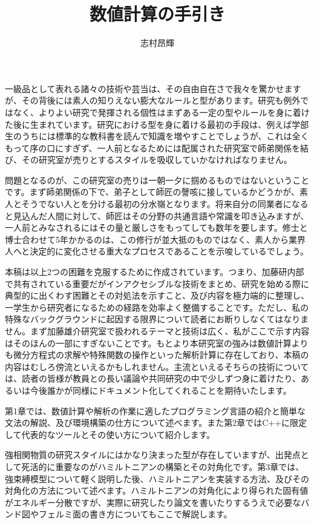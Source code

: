 \documentclass[12pt]{jreport}
\begin{document}
\title{数値計算の手引き}
\author{志村昂輝}
\maketitle

一級品として表れる諸々の技術や芸当は、その自由自在さで我々を驚かせますが、その背後には素人の知りえない膨大なルールと型があります。研究も例外ではなく、よりよい研究で発揮される個性はまずある一定の型やルールを身に着けた後に生まれています。研究における型を身に着ける最初の手段は、例えば学部生のうちには標準的な教科書を読んで知識を増やすことでしょうが、これは全くもって序の口にすぎず、一人前となるためには配属された研究室で師弟関係を結び、その研究室が売りとするスタイルを吸収していかなければなりません。

問題となるのが、この研究室の売りは一朝一夕に掴めるものではないということです。まず師弟関係の下で、弟子として師匠の謦咳に接しているかどうかが、素人とそうでない人とを分ける最初の分水嶺となります。将来自分の同業者になると見込んだ人間に対して、師匠はその分野の共通言語や常識を叩き込みますが、一人前とみなされるにはその量と厳しさをもってしても数年を要します。修士と博士合わせて5年かかるのは、この修行が並大抵のものではなく、素人から業界人へと決定的に変化させる重大なプロセスであることを示唆しているでしょう。

本稿は以上2つの困難を克服するために作成されています。つまり、加藤研内部で共有されている重要だがインアクセシブルな技術をまとめ、研究を始める際に典型的に出くわす困難とその対処法を示すこと、及び内容を極力端的に整理し、一学生から研究者になるための経路を効率よく整備することです。ただし、私の特殊なバックグラウンドに起因する限界について読者にお断りしなくてはなりません。まず加藤雄介研究室で扱われるテーマと技術は広く、私がここで示す内容はそのほんの一部にすぎないことです。もとより本研究室の強みは数値計算よりも微分方程式の求解や特殊関数の操作といった解析計算に存在しており、本稿の内容はむしろ傍流といえるかもしれません。主流といえるそちらの技術については、読者の皆様が教員との長い議論や共同研究の中で少しずつ身に着けたり、あるいは今後誰かが同様にドキュメント化してくれることを期待いたします。

第1章では、数値計算や解析の作業に適したプログラミング言語の紹介と簡単な文法の解説、及び環境構築の仕方について述べます。また第2章ではC++に限定して代表的なツールとその使い方について紹介します。

強相関物質の研究スタイルにはかなり決まった型が存在していますが、出発点として死活的に重要なのがハミルトニアンの構築とその対角化です。第3章では、強束縛模型について軽く説明した後、ハミルトニアンを実装する方法、及びその対角化の方法について述べます。ハミルトニアンの対角化により得られた固有値がエネルギー分散ですが、実際に研究したり論文を書いたりするうえで必要なバンド図やフェルミ面の書き方についてもここで解説します。
\end{document}
